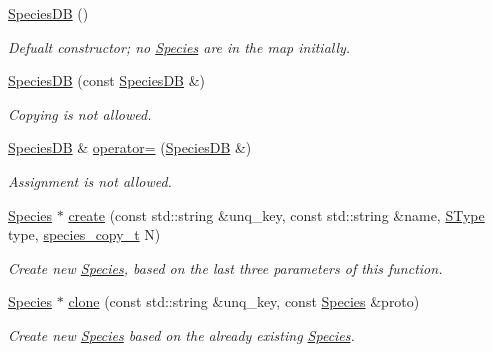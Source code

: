\begin{DoxyCompactItemize}
\item 
\hyperlink{classchem_1_1SpeciesDB_a9fea0eea2b4e1a03c01223a0027388ce}{Species\-D\-B} ()
\begin{DoxyCompactList}\small\item\em Defualt constructor; no \hyperlink{classchem_1_1Species}{Species} are in the map initially. \end{DoxyCompactList}\item 
\hyperlink{classchem_1_1SpeciesDB_aa418b479099ecec70190efb6c7028e15}{Species\-D\-B} (const \hyperlink{classchem_1_1SpeciesDB}{Species\-D\-B} \&)
\begin{DoxyCompactList}\small\item\em Copying is not allowed. \end{DoxyCompactList}\item 
\hyperlink{classchem_1_1SpeciesDB}{Species\-D\-B} \& \hyperlink{classchem_1_1SpeciesDB_ab8aa688e314e4b954f85b3e52e8cfc4a}{operator=} (\hyperlink{classchem_1_1SpeciesDB}{Species\-D\-B} \&)
\begin{DoxyCompactList}\small\item\em Assignment is not allowed. \end{DoxyCompactList}\item 
\hyperlink{classchem_1_1Species}{Species} $\ast$ \hyperlink{classchem_1_1SpeciesDB_aed75b4d5d680ce4883b70819951eb687}{create} (const std\-::string \&unq\-\_\-key, const std\-::string \&name, \hyperlink{namespacechem_ad1edc1332f82ed64dd8a810596e781da}{S\-Type} type, \hyperlink{common_8h_a3503f321fd36304ee274141275cca586}{species\-\_\-copy\-\_\-t} N)
\begin{DoxyCompactList}\small\item\em Create new \hyperlink{classchem_1_1Species}{Species}, based on the last three parameters of this function. \end{DoxyCompactList}\item 
\hyperlink{classchem_1_1Species}{Species} $\ast$ \hyperlink{classchem_1_1SpeciesDB_a8008dae386b5397a815357e581fec835}{clone} (const std\-::string \&unq\-\_\-key, const \hyperlink{classchem_1_1Species}{Species} \&proto)
\begin{DoxyCompactList}\small\item\em Create new \hyperlink{classchem_1_1Species}{Species} based on the already existing \hyperlink{classchem_1_1Species}{Species}. \end{DoxyCompactList}\item 

\end{DoxyCompactItemize}
